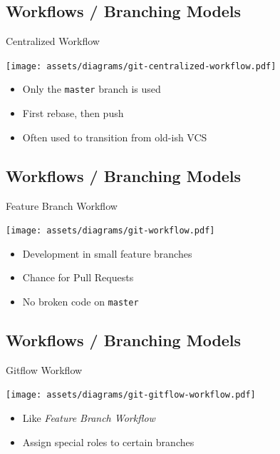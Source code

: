 \subsection{Workflows / Branching Models}
\begin{frame}[fragile]
  \subslidetitle
  Centralized Workflow
    \centerline{\texttt{[image: assets/diagrams/git-centralized-workflow.pdf]}}

  \vspace{2em}
  \begin{itemize}
    \item Only the \lstinline{master} branch is used
    \item First rebase, then push
    \item Often used to transition from old-ish VCS
  \end{itemize}
\end{frame}

\subsection{Workflows / Branching Models}
\begin{frame}[fragile]
  \subslidetitle
  Feature Branch Workflow
    \centerline{\texttt{[image: assets/diagrams/git-workflow.pdf]}}

  \vspace{2em}
  \begin{itemize}
    \item Development in small feature branches
    \item Chance for Pull Requests
    \item No broken code on \lstinline{master}
  \end{itemize}
\end{frame}

\subsection{Workflows / Branching Models}
\begin{frame}[fragile]
  \subslidetitle
  Gitflow Workflow
    \centerline{\texttt{[image: assets/diagrams/git-gitflow-workflow.pdf]}}

  \begin{itemize}
    \item Like \textit{Feature Branch Workflow}
    \item Assign special roles to certain branches
  \end{itemize}

\end{frame}

